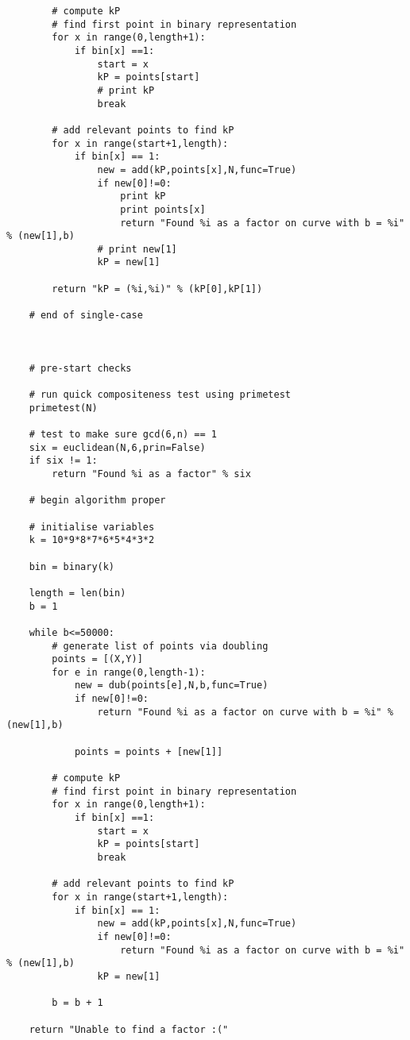 \begin{verbatim}
        # compute kP
        # find first point in binary representation
        for x in range(0,length+1):
            if bin[x] ==1:
                start = x
                kP = points[start]
                # print kP
                break

        # add relevant points to find kP
        for x in range(start+1,length):
            if bin[x] == 1:
                new = add(kP,points[x],N,func=True)
                if new[0]!=0:
                    print kP
                    print points[x]
                    return "Found %i as a factor on curve with b = %i" % (new[1],b)
                # print new[1]
                kP = new[1]

        return "kP = (%i,%i)" % (kP[0],kP[1])

    # end of single-case



    # pre-start checks

    # run quick compositeness test using primetest
    primetest(N)
    
    # test to make sure gcd(6,n) == 1
    six = euclidean(N,6,prin=False)
    if six != 1:
        return "Found %i as a factor" % six

    # begin algorithm proper

    # initialise variables
    k = 10*9*8*7*6*5*4*3*2

    bin = binary(k)
    
    length = len(bin)
    b = 1

    while b<=50000:
        # generate list of points via doubling
        points = [(X,Y)]
        for e in range(0,length-1):
            new = dub(points[e],N,b,func=True)
            if new[0]!=0:
                return "Found %i as a factor on curve with b = %i" % (new[1],b)

            points = points + [new[1]]

        # compute kP
        # find first point in binary representation
        for x in range(0,length+1):
            if bin[x] ==1:
                start = x
                kP = points[start]
                break

        # add relevant points to find kP
        for x in range(start+1,length):
            if bin[x] == 1:
                new = add(kP,points[x],N,func=True)
                if new[0]!=0:
                    return "Found %i as a factor on curve with b = %i" % (new[1],b)
                kP = new[1]

        b = b + 1
    
    return "Unable to find a factor :("
\end{verbatim}
